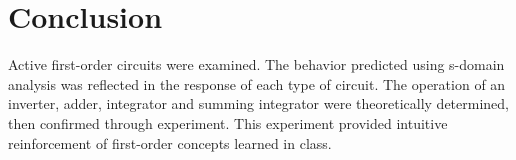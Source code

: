 \section{Conclusion}\label{sec:conclusion}
Active first-order circuits were examined.
The behavior predicted using s-domain analysis was reflected in the response of each type of circuit.
The operation of an inverter, adder, integrator and summing integrator were theoretically determined, then confirmed through experiment.
This experiment provided intuitive reinforcement of first-order concepts learned in class.
